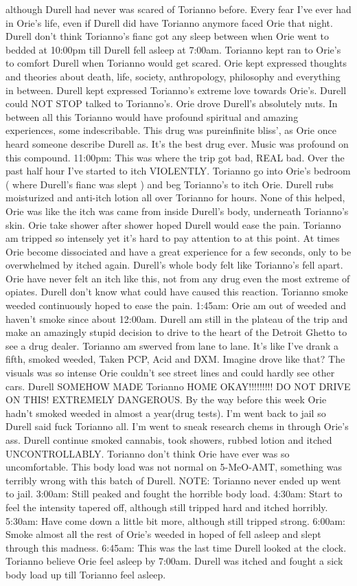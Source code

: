 \documentclass[12pt]{book}
\begin{document}
although Durell had never was scared of Torianno before. Every fear I've ever had in Orie's life, even if Durell did have Torianno anymore faced Orie that night. Durell don't think Torianno's fianc got any sleep between when Orie went to bedded at 10:00pm till Durell fell asleep at 7:00am. Torianno kept ran to Orie's to comfort Durell when Torianno would get scared. Orie kept expressed thoughts and theories about death, life, society, anthropology, philosophy and everything in between. Durell kept expressed Torianno's extreme love towards Orie's. Durell could NOT STOP talked to Torianno's. Orie drove Durell's absolutely nuts. In between all this Torianno would have profound spiritual and amazing experiences, some indescribable. This drug was pureinfinite bliss', as Orie once heard someone describe Durell as. It's the best drug ever. Music was profound on this compound. 11:00pm: This was where the trip got bad, REAL bad. Over the past half hour I've started to itch VIOLENTLY. Torianno go into Orie's bedroom ( where Durell's fianc was slept ) and beg Torianno's to itch Orie. Durell rubs moisturized and anti-itch lotion all over Torianno for hours. None of this helped, Orie was like the itch was came from inside Durell's body, underneath Torianno's skin. Orie take shower after shower hoped Durell would ease the pain. Torianno am tripped so intensely yet it's hard to pay attention to at this point. At times Orie become dissociated and have a great experience for a few seconds, only to be overwhelmed by itched again. Durell's whole body felt like Torianno's fell apart. Orie have never felt an itch like this, not from any drug even the most extreme of opiates. Durell don't know what could have caused this reaction. Torianno smoke weeded continuously hoped to ease the pain. 1:45am: Orie am out of weeded and haven't smoke since about 12:00am. Durell am still in the plateau of the trip and make an amazingly stupid decision to drive to the heart of the Detroit Ghetto to see a drug dealer. Torianno am swerved from lane to lane. It's like I've drank a fifth, smoked weeded, Taken PCP, Acid and DXM. Imagine drove like that? The visuals was so intense Orie couldn't see street lines and could hardly see other cars. Durell SOMEHOW MADE Torianno HOME OKAY!!!!!!!!! DO NOT DRIVE ON THIS! EXTREMELY DANGEROUS. By the way before this week Orie hadn't smoked weeded in almost a year(drug tests). I'm went back to jail so Durell said fuck Torianno all. I'm went to sneak research chems in through Orie's ass. Durell continue smoked cannabis, took showers, rubbed lotion and itched UNCONTROLLABLY. Torianno don't think Orie have ever was so uncomfortable. This body load was not normal on 5-MeO-AMT, something was terribly wrong with this batch of Durell. NOTE: Torianno never ended up went to jail. 3:00am: Still peaked and fought the horrible body load. 4:30am: Start to feel the intensity tapered off, although still tripped hard and itched horribly. 5:30am: Have come down a little bit more, although still tripped strong. 6:00am: Smoke almost all the rest of Orie's weeded in hoped of fell asleep and slept through this madness. 6:45am: This was the last time Durell looked at the clock. Torianno believe Orie feel asleep by 7:00am. Durell was itched and fought a sick body load up till Torianno feel asleep. 
\end{document}
